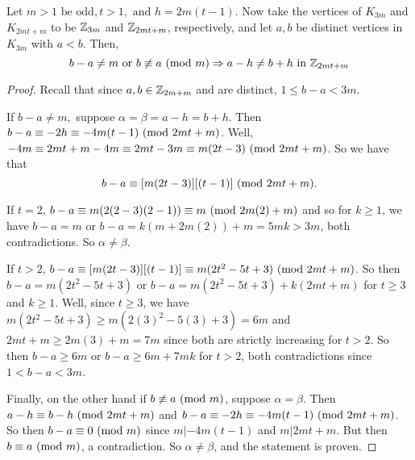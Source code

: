 \begin{thm}
  Let $m>1\text{ be odd},t>1,\text{ and } h = 2m(t-1)$. Now take the vertices of $K_{3m}$ and $K_{2mt+m}$ to be $\mathbb{Z}_{3m}$ and $\mathbb{Z}_{2mt+m}$, respectively, and let $a,b$ be distinct vertices in $K_{3m}$ with $a<b$. Then,
    $$b-a\neq m\text{ or }b\not\equiv a\ (\mathrm{mod}\ m)\Rightarrow a-h \neq b+h\text{ in }\mathbb{Z}_{2mt+m}$$

    \begin{proof}
        Recall that since $a,b\in \mathbb{Z}_{2m+m}$ and are distinct, $1\leq b-a<3m$.\newline 
        
        \noindent If $b-a\neq m,$ suppose $\alpha = \beta = a-h=b+h$. Then $b-a\equiv -2h\equiv -4m(t-1)\ (\mathrm{mod}\ 2mt+m)$. Well,  $-4m \equiv 2mt+m-4m\equiv 2mt-3m\equiv m(2t-3)\ (\mathrm{mod}\ 2mt+m)$. So we have that $$b-a\equiv [m(2t-3)][(t-1)]\ (\mathrm{mod}\ 2mt+m).$$
        
        \noindent If $t=2$, $b-a\equiv m(2(2-3)(2-1))\equiv m\ (\mathrm{mod}\ 2m(2)+m)$ and so for $k\geq 1$, we have $b-a = m$ or $b-a= k(m+2m(2))+m = 5mk>3m$, both contradictions. So $\alpha\neq \beta$.\newline
        
        \noindent If $t>2$, $b-a\equiv [m(2t-3)][(t-1)] \equiv m(2t^{2}-5t+3)\ (\mathrm{mod}\ 2mt+m)$. So then $b-a=m(2t^{2}-5t+3)$ or $b-a=m(2t^{2}-5t+3) + k(2mt+m)$ for $t\geq 3$ and $k\geq 1$. Well, since $t\geq 3$, we have $m(2t^{2}-5t+3)\geq m(2(3)^{2}-5(3)+3)=6m$ and $2mt+m\geq 2m(3)+m=7m$ since both are strictly increasing for $t>2$. So then $b-a\geq 6m$ or $b-a\geq 6m+7mk$ for $t>2$, both contradictions since $1<b-a<3m$.\newline

        \noindent Finally, on the other hand if $b\not\equiv a\ (\mathrm{mod}\ m)$, suppose $\alpha = \beta$. Then $a-h\equiv b-h \ (\mathrm{mod}\ 2mt+m)$ and $b-a\equiv -2h\equiv -4m(t-1)\ (\mathrm{mod}\ 2mt+m)$. So then $b-a\equiv 0\ (\mathrm{mod}\ m)$ since $m|-4m(t-1)$ and $m|2mt+m.$ But then $b\equiv a\ (\mathrm{mod}\ m)$, a contradiction. So $\alpha\neq \beta$, and the statement is proven.
        
    \end{proof}
\end{thm}


